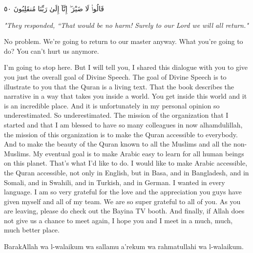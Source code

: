 \documentclass[12pt]{article}
\begin{document}
\textarabic{قَالُوا۟ لَا ضَيْرَ ۖ إِنَّآ إِلَىٰ رَبِّنَا مُنقَلِبُونَ ٥٠}

\textit{"They responded, “That would be no harm! Surely to our Lord we will all return."}

No problem. We're going to return to our master anyway. What you're going to do? You can't hurt us anymore. 

I'm going to stop here. But I will tell you, I shared this dialogue with you to give you just the overall goal of Divine Speech. The goal of Divine Speech is to illustrate to you that the Quran is a living text. That the book describes the narrative in a way that takes you inside a world. You get inside this world and it is an incredible place. And it is unfortunately in my personal opinion so underestimated. So underestimated. The mission of the organization that I started and that I am blessed to have so many colleagues in now alhamdulillah, the mission of this organization is to make the Quran accessible to everybody. And to make the beauty of the Quran known to all the Muslims and all the non-Muslims. My eventual goal is to make Arabic easy to learn for all human beings on this planet. That's what I'd like to do. I would like to make Arabic accessible, the Quran accessible, not only in English, but in Basa, and in Bangladesh, and in Somali, and in Swahili, and in Turkish, and in German. I wanted in every language. I am so very grateful for the love and the appreciation you guys have given myself and all of my team. We are so super grateful to all of you. As you are leaving, please do check out the Bayina TV booth. And finally, if Allah does not give us a chance to meet again, I hope you and I meet in a much, much, much better place. 

BarakAllah wa l-walaikum wa sallamu a'rekum wa rahmatullahi wa l-walaikum.
\end{document}
